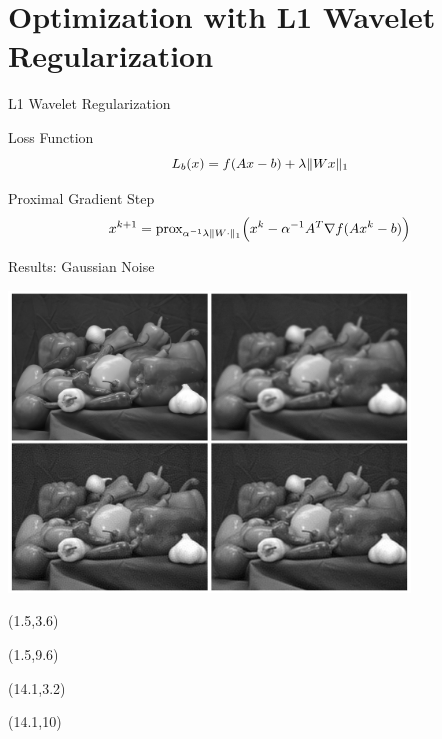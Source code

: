 \documentclass[12pt]{beamer}
\newcommand{\prox}{\text{prox}}
\begin{document}
\section{Optimization with L1 Wavelet Regularization}

\begin{frame}{L1 Wavelet Regularization}
\begin{block}{Loss Function}
\[ L_b(x) = f(Ax-b) + \lambda \| Wx \|_1 \vspace{1ex} \]
\end{block}

\vspace{2ex}
\begin{block}{Proximal Gradient Step}
\[ x^{k+1} = \prox_{\alpha^{-1}\lambda \| W \cdot \|_1} \Big(x^k - \alpha^{-1} A^T\nabla f (Ax^k - b)\Big) \vspace{1ex} \]
\end{block}
\end{frame}

\begin{frame}{Results: Gaussian Noise}
\begin{center}
\vspace{-3 mm}
\includegraphics[width = 0.8\textwidth]{../figures/wavGaussian_2.pdf} 
\end{center}

\begin{textblock}{5}(1.5,3.6)
\end{textblock}

\begin{textblock}{5}(1.5,9.6)
\end{textblock}

\begin{textblock}{5}(14.1,3.2)
\end{textblock}

\begin{textblock}{5}(14.1,10)
\end{textblock}
\end{frame}
\end{document}
